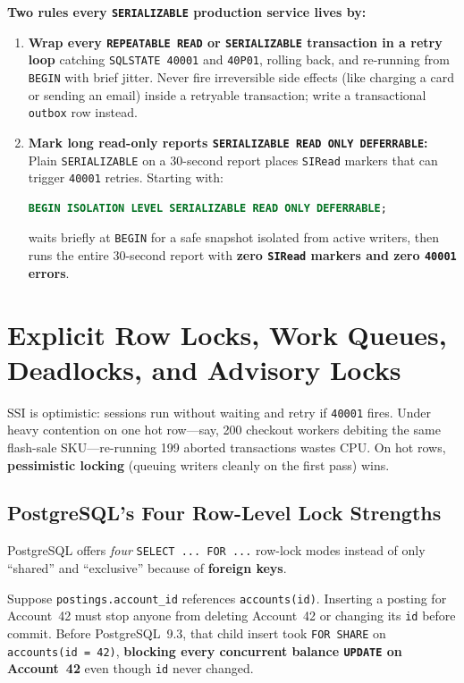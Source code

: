 \begin{applicationbox}
\textbf{Two rules every \texttt{SERIALIZABLE} production service lives by:}
\begin{enumerate}
  \item \textbf{Wrap every \texttt{REPEATABLE READ} or \texttt{SERIALIZABLE} transaction in a retry loop} catching \texttt{SQLSTATE 40001} and \texttt{40P01}, rolling back, and re-running from \texttt{BEGIN} with brief jitter. Never fire irreversible side effects (like charging a card or sending an email) inside a retryable transaction; write a transactional \texttt{outbox} row instead.
  \item \textbf{Mark long read-only reports \texttt{SERIALIZABLE READ ONLY DEFERRABLE}:} Plain \texttt{SERIALIZABLE} on a 30-second report places \texttt{SIRead} markers that can trigger \texttt{40001} retries. Starting with:
\begin{lstlisting}[language=SQL]
BEGIN ISOLATION LEVEL SERIALIZABLE READ ONLY DEFERRABLE;
\end{lstlisting}
  waits briefly at \texttt{BEGIN} for a safe snapshot isolated from active writers, then runs the entire 30-second report with \textbf{zero \texttt{SIRead} markers and zero \texttt{40001} errors}.
\end{enumerate}
\end{applicationbox}

\section{Explicit Row Locks, Work Queues, Deadlocks, and Advisory Locks}
\label{ch06:explicit-locks}

SSI is optimistic: sessions run without waiting and retry if \texttt{40001} fires. Under heavy contention on one hot row---say, 200 checkout workers debiting the same flash-sale SKU---re-running 199 aborted transactions wastes CPU. On hot rows, \textbf{pessimistic locking} (queuing writers cleanly on the first pass) wins.

\subsection{PostgreSQL's Four Row-Level Lock Strengths}

PostgreSQL offers \emph{four} \texttt{SELECT ... FOR ...} row-lock modes instead of only ``shared'' and ``exclusive'' because of \textbf{foreign keys}.

Suppose \texttt{postings.account\_id} references \texttt{accounts(id)}. Inserting a posting for Account~42 must stop anyone from deleting Account~42 or changing its \texttt{id} before commit. Before PostgreSQL~9.3, that child insert took \texttt{FOR SHARE} on \texttt{accounts(id = 42)}, \textbf{blocking every concurrent balance \texttt{UPDATE} on Account~42} even though \texttt{id} never changed.


